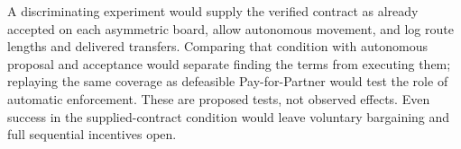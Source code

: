\documentclass{article}
\begin{document}
A discriminating experiment would supply the verified contract as already accepted on each asymmetric board,
allow autonomous movement, and log route lengths and delivered transfers. Comparing that condition with
autonomous proposal and acceptance would separate finding the terms from executing them; replaying the same
coverage as defeasible Pay-for-Partner would test the role of automatic enforcement. These are proposed tests,
not observed effects. Even success in the supplied-contract condition would leave voluntary bargaining and
full sequential incentives open. %



\end{document}
